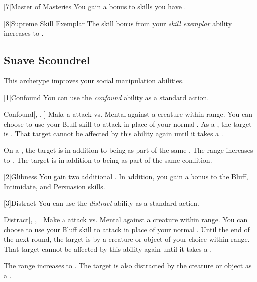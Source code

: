         [7]{Master of Masteries} You gain a  bonus to skills you have .

        [8]{Supreme Skill Exemplar} The skill bonus from your \textit{skill exemplar} ability increases to .

    \subsection{Suave Scoundrel}
        This archetype improves your social manipulation abilities.

        [1]{Confound} You can use the \textit{confound} ability as a standard action.
        \begin{freeability}{Confound}[, , ]
            Make a attack vs. Mental against a creature within \rngclose range.
            You can choose to use your Bluff skill to attack in place of your normal .
            \hit As a , the target is .
            That target cannot be affected by this ability again until it takes a .

            \rankline
             On a , the target is  in addition to being  as part of the same .
             The range increases to \rngmed.
             The target is  in addition to being  as part of the same condition.
        \end{freeability}

        [2]{Glibness} You gain two additional .
        In addition, you gain a  bonus to the Bluff, Intimidate, and Persuasion skills.

        [3]{Distract} You can use the \textit{distract} ability as a standard action.
        \begin{freeability}{Distract}[, , ]
            Make a attack vs. Mental against a creature within \rngclose range.
            You can choose to use your Bluff skill to attack in place of your normal .
            \hit Until the end of the next round, the target is  by a creature or object of your choice within range.
            That target cannot be affected by this ability again until it takes a .

            \rankline
             The range increases to \rngmed.
             The target is also distracted by the creature or object as a .
        \end{freeability}

